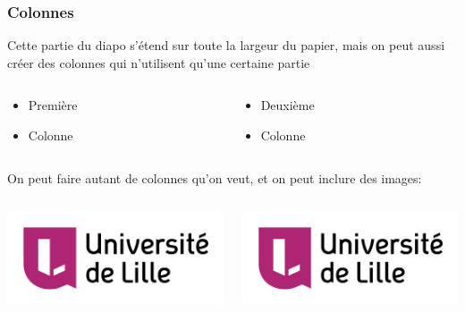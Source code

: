 \documentclass[svgnames,12pt,aspectratio=149]{beamer}
\begin{document}
\begin{frame}
  \frametitle{Colonnes}
  Cette partie du diapo s'étend sur toute la largeur du papier, mais on peut aussi créer des colonnes qui n'utilisent qu'une certaine partie

  \begin{columns}
    \begin{column}{0.5\textwidth}
      \begin{itemize}
      \item Première 
      \item Colonne
      \end{itemize}
    \end{column}
    \begin{column}{0.5\textwidth}
      \begin{itemize}
      \item Deuxième
      \item Colonne
      \end{itemize}
    \end{column}
  \end{columns}

  \vspace{1cm}
    On peut faire autant de colonnes qu'on veut, et on peut inclure des images:

    
  \begin{columns}
    \begin{column}{0.33\textwidth}
      \includegraphics[width=1.0\textwidth]{logo-UdLille}
    \end{column}
    \begin{column}{0.33\textwidth}
      \includegraphics[width=1.0\textwidth]{logo-UdLille}
    \end{column}


\end{columns}
\end{frame}
\end{document}
